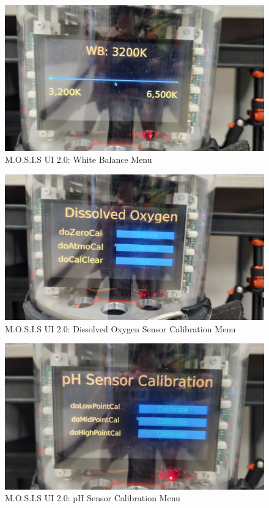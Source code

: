 \begin{figure}[H]
  \begin{center}
  \includegraphics[width=\textwidth]{../Appendix/Design_Documentation/System_Snapshots/Figures/White_Balance_Select.jpeg}
  \end{center}
  \caption{M.O.S.I.S UI 2.0: White Balance Menu}
\end{figure}
\begin{figure}[H]
  \begin{center}
  \includegraphics[width=\textwidth]{../Appendix/Design_Documentation/System_Snapshots/Figures/DO_Calibration_Menu.jpeg}
  \end{center}
  \caption{M.O.S.I.S UI 2.0: Dissolved Oxygen Sensor Calibration Menu}
\end{figure}
\begin{figure}[H]
  \begin{center}
  \includegraphics[width=\textwidth]{../Appendix/Design_Documentation/System_Snapshots/Figures/pH_Sensor_Calibration.jpeg}
  \end{center}
  \caption{M.O.S.I.S UI 2.0: pH Sensor Calibration Menu}
\end{figure}